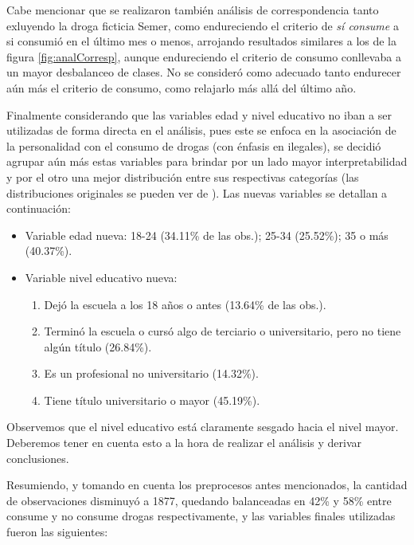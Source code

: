\documentclass[a4paper,twocolumn]{article}
\begin{document}
Cabe mencionar que se realizaron también análisis de correspondencia tanto exluyendo la droga ficticia Semer, como endureciendo el criterio de \emph{sí consume} a si consumió en el último mes o menos, arrojando resultados similares a los de la figura \ref{fig:analCorresp}, aunque endureciendo el criterio de consumo conllevaba a un mayor desbalanceo de clases. No se consideró como adecuado tanto endurecer aún más el criterio de consumo, como relajarlo más allá del último año.

Finalmente considerando que las variables edad y nivel educativo no iban a ser utilizadas de forma directa en el análisis, pues este se enfoca en la asociación de la personalidad con el consumo de drogas (con énfasis en ilegales), se decidió agrupar aún más estas variables para brindar por un lado mayor interpretabilidad y por el otro una mejor distribución entre sus respectivas categorías (las distribuciones originales se pueden ver de \cite{dataset}). Las nuevas variables se detallan a continuación:

\begin{itemize}
	\item Variable edad nueva: 18-24 (34.11\% de las obs.); 25-34 (25.52\%); 35 o más (40.37\%).
	\item Variable nivel educativo nueva:
	\begin{enumerate}[label=\arabic*)]
		\item Dejó la escuela a los 18 años o antes (13.64\% de las obs.).
		\item Terminó la escuela o cursó algo de terciario o universitario, pero no tiene algún título (26.84\%).
		\item Es un profesional no universitario (14.32\%).
		\item Tiene título universitario o mayor (45.19\%).
	\end{enumerate}
\end{itemize}

Observemos que el nivel educativo está claramente sesgado hacia el nivel mayor. Deberemos tener en cuenta esto a la hora de realizar el análisis y derivar conclusiones.

Resumiendo, y tomando en cuenta los preprocesos antes mencionados, la cantidad de observaciones disminuyó a 1877, quedando balanceadas en 42\% y 58\% entre consume y no consume drogas respectivamente, y las variables finales utilizadas fueron las siguientes:
\end{document}
